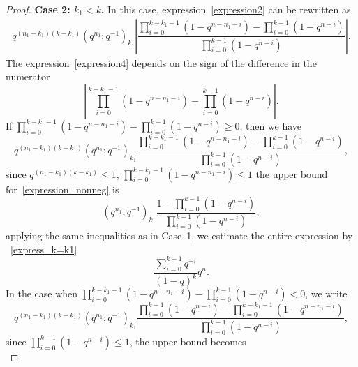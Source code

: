 \documentclass[12pt, a4paper]{amsart}
\numberwithin{equation}{subsection}
\theoremstyle{definition}
\begin{document}
\begin{proof}
\textbf{Case 2: \( k_1 < k \).} In this case, expression~\eqref{expression2} can be rewritten as  
\begin{align}\label{expression4}
q^{(n_{1}-k_{1})(k-k_{1})}\left(q^{n_{1}}; q^{-1}\right)_{k_{1}} \left|\dfrac{\prod_{i=0}^{k-k_{1}-1}\left(1 - q^{n- n_{1} - i}\right) - \prod_{i=0}^{k-1}\left(1 - q^{n - i}\right)}{\prod_{i=0}^{k-1}\left(1 - q^{n - i}\right)}\right|.
\end{align}  
The expression~\eqref{expression4} depends on the sign of the difference in the numerator 
\begin{equation}
\left|\prod_{i=0}^{k-k_{1}-1}\left(1 - q^{n- n_{1} - i}\right) - \prod_{i=0}^{k-1}\left(1 - q^{n - i}\right)\right|.
\end{equation}  
If \(\prod_{i=0}^{k-k_{1}-1}\left(1 - q^{n- n_{1} - i}\right) - \prod_{i=0}^{k-1}\left(1 - q^{n - i}\right) \geqslant 0\), then we have  
\begin{equation}\label{expression_nonneg}
q^{(n_{1}-k_{1})(k-k_{1})}\left(q^{n_{1}}; q^{-1}\right)_{k_{1}} \dfrac{\prod_{i=0}^{k-k_{1}-1}\left(1 - q^{n- n_{1} - i}\right) - \prod_{i=0}^{k-1}\left(1 - q^{n - i}\right)}{\prod_{i=0}^{k-1}\left(1 - q^{n - i}\right)},
\end{equation}  
since \(q^{(n_{1}-k_{1})(k-k_{1})}\leqslant 1\), \(\prod_{i=0}^{k-k_{1}-1}\left(1 - q^{n- n_{1} - i}\right) \leqslant 1\) the upper bound for~\eqref{expression_nonneg} is  
\begin{equation*}
\left(q^{n_{1}}; q^{-1}\right)_{k_{1}} \dfrac{1 - \prod_{i=0}^{k-1}\left(1 - q^{n - i}\right)}{\prod_{i=0}^{k-1}\left(1 - q^{n - i}\right)},
\end{equation*}  
applying the same inequalities as in Case~1, we estimate the entire expression by ~\eqref{express_k=k1}
\begin{equation*}
\dfrac{\sum_{i=0}^{k-1} q^{-i}}{(1-q)^{k}} q^{n}. 
\end{equation*}
In the case when \(\prod_{i=0}^{k-k_{1}-1}\left(1 - q^{n- n_{1} - i}\right) - \prod_{i=0}^{k-1}\left(1 - q^{n - i}\right) < 0\), we write  
\begin{equation}
q^{(n_{1}-k_{1})(k-k_{1})}\left(q^{n_{1}}; q^{-1}\right)_{k_{1}} \dfrac{\prod_{i=0}^{k-1}\left(1 - q^{n - i}\right) - \prod_{i=0}^{k-k_{1}-1}\left(1 - q^{n- n_{1} - i}\right)}{\prod_{i=0}^{k-1}\left(1 - q^{n - i}\right)},
\end{equation}  
since \(\prod_{i=0}^{k-1}\left(1 - q^{n - i}\right) \leqslant 1\), the upper bound becomes  
\begin{equation}

\end{equation}
\end{proof}
\end{document}
